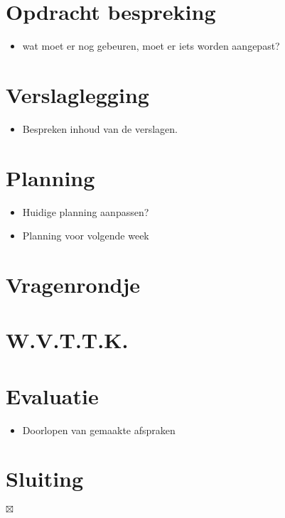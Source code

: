 \documentclass[]{article}
\begin{document}
\section{Opdracht bespreking}

  \begin{itemize}
    \item wat moet er nog gebeuren, moet er iets worden aangepast?
  \end{itemize}

\section{Verslaglegging}

  \begin{itemize}
    \item Bespreken inhoud van de verslagen.
  \end{itemize}

\section{Planning}
  \begin{itemize}
    \item Huidige planning aanpassen?
    \item Planning voor volgende week
  \end{itemize}

\section{Vragenrondje}\label{sec:vraagrondje} %


\section{W.V.T.T.K.}\label{sec:w_v_t_t_k_} %


\section{Evaluatie}
  \begin{itemize}
    \item Doorlopen van gemaakte afspraken
  \end{itemize}

\section{Sluiting}

$\boxtimes$
\end{document}
